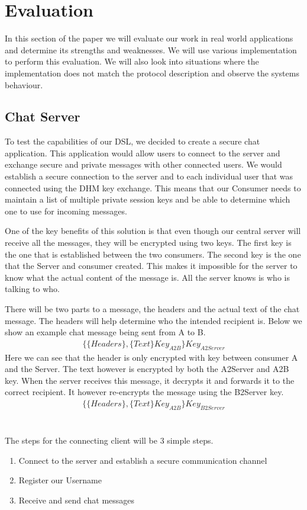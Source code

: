 \section{Evaluation}
In this section of the paper we will evaluate our work in real world applications and determine its strengths and weaknesses. We will use various implementation to perform this evaluation. We will also look into situations where the implementation does not match the protocol description and observe the systems behaviour.

\subsection{Chat Server}
To test the capabilities of our DSL, we decided to create a secure chat application. This application would allow  users to connect to the server and exchange secure and private messages with other connected users. We would establish a secure connection to the server and to each individual user that was connected using the DHM key exchange. This means that our Consumer needs to maintain a list of multiple private session keys and be able to determine which one to use for incoming messages.

One of the key benefits of this solution is that even though our central server will receive all the messages, they will be encrypted using two keys. The first key is the one that is established between the two consumers. The second key is the one that the Server and consumer created. This makes it impossible for the server to know what the actual content of the message is. All the server knows is who is talking to who. 

There will be two parts to a message, the headers and the actual text of the chat message. The headers will help determine who the intended recipient is. Below we show an example chat message being sent from A to B.
$$
 \begin{multlined}
  \{\{Headers\}, \{Text\}Key_{A2B}\}Key_{A2Server}
 \end{multlined}
$$
Here we can see that the header is only encrypted with key between consumer A and the Server. The text however is encrypted by both the A2Server and A2B key. When the server receives this message, it decrypts it and forwards it to the correct recipient. It however re-encrypts the message using the B2Server key.
$$
 \begin{multlined}
  \{\{Headers\}, \{Text\}Key_{A2B}\}Key_{B2Server}
 \end{multlined}
$$
\\\\
The steps for the connecting client will be 3 simple steps. 
\begin{enumerate}
 \item Connect to the server and establish a secure communication channel
 \item Register our Username
 \item Receive and send chat messages
\end{enumerate}

